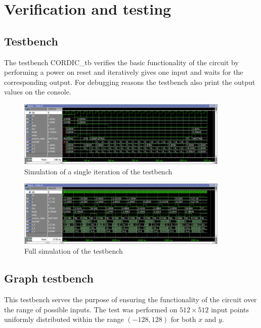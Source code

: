 \chapter{Verification and testing}
\label{chap:utlization_report}

\section{Testbench}
The testbench CORDIC\_tb verifies the basic functionality of the circuit by performing a power on reset and iteratively gives one input and waits for the corresponding output. For debugging reasons the testbench also print the output values on the console.

\begin{code}
    \label{code:testbench}
\end{code}

\begin{figure}[!ht]
    \centering
    \includegraphics[width=0.9\textwidth]{./images/Verification/wavesmall.png}
    \caption{Simulation of a single iteration of the testbench}
    \label{fig:wavesmall}
\end{figure}

\begin{figure}[!ht]
    \centering
    \includegraphics[width=0.9\textwidth]{./images/Verification/wavebig.png}
    \caption{Full simulation of the testbench}
    \label{fig:wavebig}
\end{figure}


\section{Graph testbench}
This testbench serves the purpose of ensuring the functionality of the circuit over the range of possible inputs. The test was performed on \( 512 \times 512 \)  input points uniformly distributed within the range \( (-128, 128) \) for both \( x \) and \( y \).

